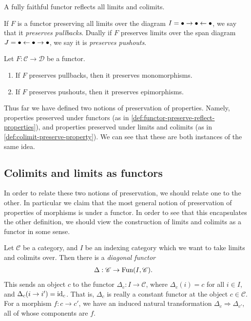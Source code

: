 \begin{proposition}\label{prop:fully-faithful-functor-reflects-limits-colimits} A fully faithful functor reflects all limits and colimits.
\end{proposition}


\begin{remark}\label{rmk:labelname} If $F$ is a functor preserving all limits over the diagram $I = \bullet \to \bullet \leftarrow \bullet$, we say that it \textit{preserves pullbacks}. Dually if $F$ preserves limits over the span diagram $J = \bullet \leftarrow \bullet \to \bullet$, we say it is \textit{preserves pushouts}.
\end{remark}

\begin{exercise}\label{exer:pullback-preserving-functor-preserves-monos} Let $F: \mathscr{C}\to \mathscr{D}$ be a functor.
\begin{enumerate}
    \item If $F$ preserves pullbacks, then it preserves monomorphisms.
    \item If $F$ preserves pushouts, then it preserves epimorphisms.
\end{enumerate}
\end{exercise}

Thus far we have defined two notions of preservation of properties. Namely, properties preserved under functors (as in \autoref{def:functor-preserve-reflect-properties}), and properties preserved under limits and colimits (as in \autoref{def:colimit-preserve-property}). We can see that these are both instances of the same idea.

\subsection{Colimits and limits as functors}

In order to relate these two notions of preservation, we should relate one to the other. In particular we claim that the most general notion of preservation of properties of morphisms is under a functor. In order to see that this encapsulates the other definition, we should view the construction of limits and colimits as a functor in some sense.

Let $\mathscr{C}$ be a category, and $I$ be an indexing category which we want to take limits and colimits over. Then there is a \textit{diagonal functor}
\begin{align*}
    \Delta : \mathscr{C} &\to \text{Fun}(I, \mathscr{C}).
\end{align*}
This sends an object $c$ to the functor $\Delta_c: I \to \mathscr{C}$, where $\Delta_c(i) = c$ for all $i\in I$, and $\Delta_c(i \to i') = \text{id}_c$. That is, $\Delta_c$ is really a constant functor at the object $c\in \mathscr{C}$. For a morphism $f:c\to c'$, we have an induced natural transformation  $\Delta_c \Rightarrow \Delta_{c'}$, all of whose components are $f$. 

